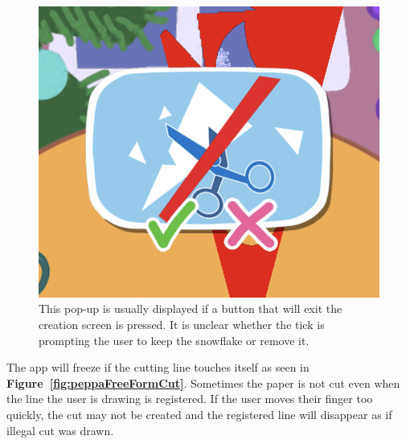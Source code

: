 \documentclass[11pt]{article}
\begin{document}
\begin{figure}[!ht]
\begin{minipage}{0.32\textwidth}
                        \end{minipage}
                        \begin{minipage}{0.32\textwidth}
                            \centering
                            \includegraphics[width=0.8\linewidth]{Images/peppa/peppaPopUp.png}
                             \caption{This pop-up is usually displayed if a button that will exit the creation screen is pressed. It is unclear whether the tick is prompting the user to keep the snowflake or remove it.}
                            \label{fig:peppaPopUp}
                        \end{minipage}
                    \end{figure}
                    
                    The app will freeze if the cutting line touches itself as seen in \textbf{Figure~\ref{fig:peppaFreeFormCut}}. Sometimes the paper is not cut even when the line the user is drawing is registered. If the user moves their finger too quickly, the cut may not be created and the registered line will disappear as if illegal cut was drawn.
                    
\end{document}
